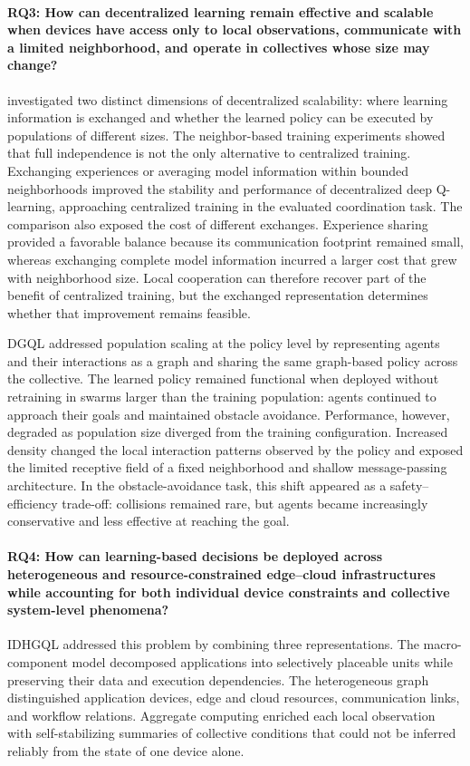 \paragraph{RQ3: How can decentralized learning remain effective and scalable
when devices have access only to local observations, communicate with a limited
neighborhood, and operate in collectives whose size may change?}
 investigated two distinct dimensions of decentralized scalability:
 where learning information is exchanged and whether the learned policy 
 can be executed by populations of different sizes.
%
The neighbor-based training experiments showed that full independence 
 is not the only alternative to centralized training.
%
Exchanging experiences or averaging model information within bounded neighborhoods 
improved the stability and performance of decentralized deep Q-learning, 
approaching centralized training in the evaluated coordination task.
%
The comparison also exposed the cost of different exchanges. 
%
Experience sharing provided a favorable balance because its communication footprint remained small,
 whereas exchanging complete model information incurred a larger cost that grew with neighborhood size.
% 
Local cooperation can therefore recover part of the benefit of centralized training, 
 but the exchanged representation determines whether that improvement remains feasible.

DGQL addressed population scaling at the policy level by representing agents 
 and their interactions as a graph and sharing the same graph-based policy across the collective.
%
The learned policy remained functional when deployed without retraining 
 in swarms larger than the training population: 
 agents continued to approach their goals and maintained obstacle avoidance.
%
Performance, however, 
 degraded as population size diverged from the training configuration. 
% 
Increased density changed the local interaction patterns observed by the policy 
 and exposed the limited receptive field of a fixed neighborhood 
 and shallow message-passing architecture. 
% 
In the obstacle-avoidance task, this shift appeared as a safety--efficiency trade-off:
 collisions remained rare, but agents became increasingly conservative and less effective at reaching the goal.

\paragraph{RQ4: How can learning-based decisions be deployed across heterogeneous
and resource-constrained edge--cloud infrastructures while accounting for both
individual device constraints and collective system-level phenomena?}
IDHGQL addressed this problem by combining three representations.
%
The macro-component model decomposed applications into selectively placeable
 units while preserving their data and execution dependencies.
%
The heterogeneous graph distinguished application devices,
 edge and cloud resources, communication links, and workflow relations.
%
Aggregate computing enriched each local observation with self-stabilizing
 summaries of collective conditions that could not be inferred reliably from the
 state of one device alone.


